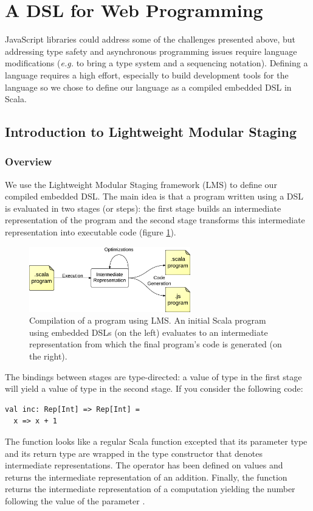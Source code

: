 \documentclass[american,english,runningheads]{llncs}
\newcommand{\eg}{\emph{e.g.}}
\begin{document}
\section{A DSL for Web Programming}
\label{solution}

JavaScript libraries could address some of the challenges presented above, but addressing type safety and
asynchronous programming issues require language modifications (\eg{} to bring a type system and a sequencing
notation). Defining a language requires a high effort, especially to build development tools for the language so we
chose to define our language as a compiled embedded DSL in Scala.

\subsection{Introduction to Lightweight Modular Staging}
\label{intro-lms}

\subsubsection{Overview}

We use the Lightweight Modular Staging framework (LMS) to define our compiled embedded DSL. The main idea is that a
program written using a DSL is evaluated in two stages (or steps): the first stage builds an intermediate
representation of the program and the second stage transforms this intermediate representation into executable code
(figure \ref{lms-diagram}).

\begin{figure}
  \centering
  \includegraphics[width=7cm]{lms.pdf}
  \caption{Compilation of a program using LMS. An initial Scala program using embedded DSLs (on the left) evaluates
  to an intermediate representation from which the final program’s code is generated (on the right).}
  \label{lms-diagram}
\end{figure}

The bindings between stages are type-directed: a value of type  in the first stage will yield a value
of type  in the second stage. If you consider the following code:
\begin{lstlisting}
val inc: Rep[Int] => Rep[Int] =
  x => x + 1
\end{lstlisting}
The function looks like
a regular Scala function excepted that its parameter type and its return type are wrapped in the  type
constructor that denotes intermediate representations. The \code{+} operator has been defined on 
values and returns the intermediate representation of an addition. Finally, the  function returns the
intermediate representation of a computation yielding the number following the value of the parameter .
\end{document}
